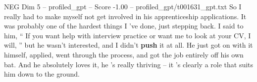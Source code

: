 \begin{textsample}{NEG Dim 5 – profiled\_gpt – Score -1.00 – profiled\_gpt/t001631\_gpt.txt}  \label{ex:f5_neg_029}
So I really had to make myself not get involved in his apprenticeship applications.
It was probably one of the hardest things I ’ve done, just stepping back.
I said to him, “ If you want help with interview practice or want me to look at your CV, I will, ” but he wasn't interested, and I didn't \textbf{push} it at all.
He just got on with it himself, applied, went through the process, and got the job entirely off his own bat.
And he absolutely loves it, he ’s really thriving – it ’s clearly a role that suits him down to the ground.

\end{textsample}
